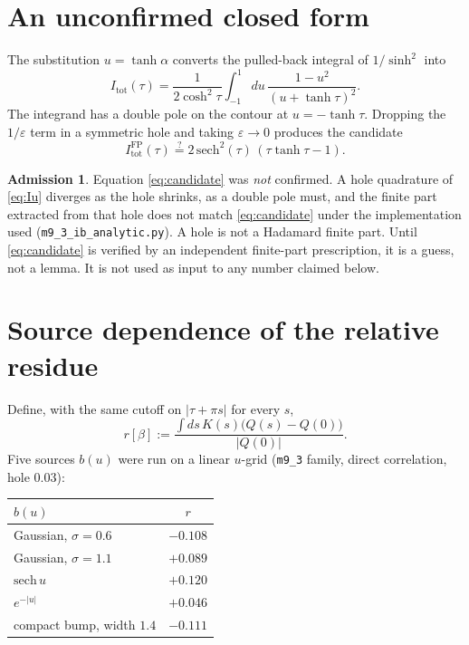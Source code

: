 \documentclass[11pt]{article}
\theoremstyle{definition}
\newtheorem*{admission}{Admission}
\begin{document}
\section{An unconfirmed closed form}
\label{sec:closed}

The substitution $u=\tanh\alpha$ converts the pulled-back integral of
$1/\sinh^{2}$ into
\begin{equation}
I_{\mathrm{tot}}(\tau)
=
\frac{1}{2\cosh^{2}\tau}
\int_{-1}^{1}\!du\,\frac{1-u^{2}}{(u+\tanh\tau)^{2}}.
\label{eq:Iu}
\end{equation}
The integrand has a double pole on the contour at $u=-\tanh\tau$.
Dropping the $1/\varepsilon$ term in a symmetric hole and taking
$\varepsilon\to 0$ produces the candidate
\begin{equation}
I_{\mathrm{tot}}^{\mathrm{FP}}(\tau)
\stackrel{?}{=}
2\,\mathrm{sech}^{2}(\tau)\,(\tau\tanh\tau-1).
\label{eq:candidate}
\end{equation}

\begin{admission}
Equation \eqref{eq:candidate} was \emph{not} confirmed. A hole
quadrature of \eqref{eq:Iu} diverges as the hole shrinks, as a double
pole must, and the finite part extracted from that hole does not
match \eqref{eq:candidate} under the implementation used
(\texttt{m9\_3\_ib\_analytic.py}). A hole is not a Hadamard finite
part. Until \eqref{eq:candidate} is verified by an independent
finite-part prescription, it is a guess, not a lemma. It is not used
as input to any number claimed below.
\end{admission}

\section{Source dependence of the relative residue}
\label{sec:src}

Define, with the same cutoff on $| \tau+\pi s |$ for every $s$,
\begin{equation}
r[\beta]
:=
\frac{\displaystyle\int ds\,K(s)\bigl(Q(s)-Q(0)\bigr)}{|Q(0)|}.
\label{eq:r}
\end{equation}
Five sources $b(u)$ were run on a linear $u$-grid
(\texttt{m9\_3} family, direct correlation, hole $0.03$):

\begin{center}
\begin{tabular}{@{}lc@{}}
\toprule
$b(u)$ & $r$ \\
\midrule
Gaussian, $\sigma=0.6$ & $-0.108$ \\
Gaussian, $\sigma=1.1$ & $+0.089$ \\
$\mathrm{sech}\,u$ & $+0.120$ \\
$e^{-|u|}$ & $+0.046$ \\
compact bump, width $1.4$ & $-0.111$ \\
\bottomrule
\end{tabular}
\end{center}
\end{document}
